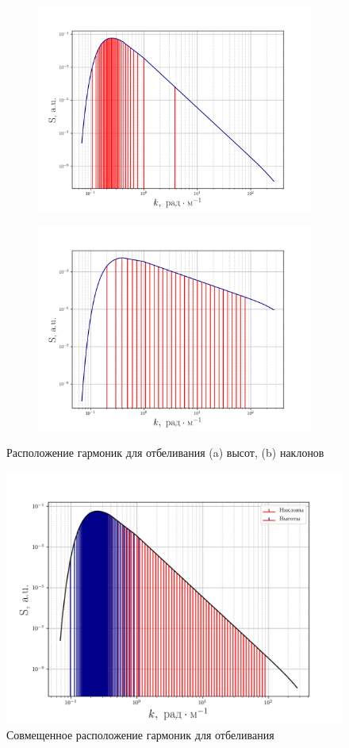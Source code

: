 \begin{figure}[h!]
    \begin{subfigure}{0.49\linewidth}
        \includegraphics[width=\linewidth]{fig/fig1}
        \caption{}
    \end{subfigure}
    \begin{subfigure}{0.49\linewidth}
        \includegraphics[width=\linewidth]{fig/fig2}
        \caption{}
    \end{subfigure}
    \caption{Расположение гармоник для отбеливания (a) высот, (b) наклонов}
\end{figure}
\begin{figure}[h!]
    \centering
    \includegraphics[width=0.6\linewidth]{fig/fig3}
    \caption{Совмещенное расположение гармоник для отбеливания}
    \label{fig:}
\end{figure}

